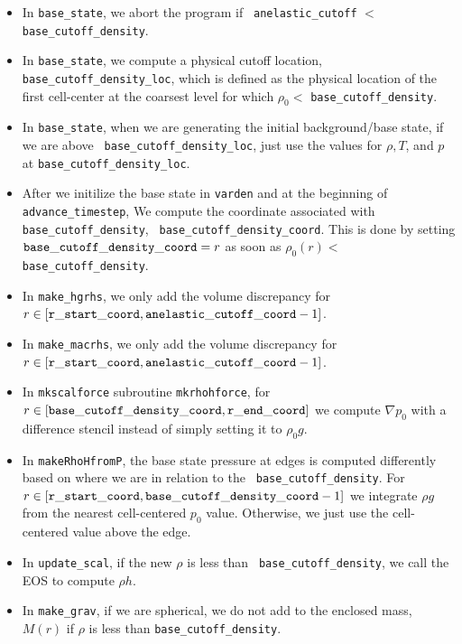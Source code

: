 \documentclass[11pt]{article}
\begin{document}
\begin{itemize}

\item In {\tt base\_state}, we abort the program if {\tt
  anelastic\_cutoff} $<$ {\tt base\_cutoff\_density}.

\item In {\tt base\_state}, we compute a physical cutoff location,
  {\tt base\_cutoff\_density\_loc}, which is defined as the physical
  location of the first cell-center at the coarsest level for which
  $\rho_0 <$ {\tt base\_cutoff\_density}.

\item In {\tt base\_state}, when we are generating the initial
  background/base state, if we are above {\tt
    base\_cutoff\_density\_loc}, just use the values for $\rho,T$, and
  $p$ at {\tt base\_cutoff\_density\_loc}.

\item After we initilize the base state in {\tt varden} and at the
  beginning of {\tt advance\_timestep}, We compute the coordinate
  associated with {\tt base\_cutoff\_density}, {\tt
    base\_cutoff\_density\_coord}.  This is done by setting ${\tt
    base\_cutoff\_density\_coord}= r$ as soon as $\rho_0(r) <$ {\tt
    base\_cutoff\_density}.

\item In {\tt make\_hgrhs}, we only add the volume discrepancy for
  $r\in[{\tt r\_start\_coord},{\tt anelastic\_cutoff\_coord}-1]$.

\item In {\tt make\_macrhs}, we only add the volume discrepancy for
  $r\in[{\tt r\_start\_coord},{\tt anelastic\_cutoff\_coord}-1]$.

\item In {\tt mkscalforce} subroutine {\tt mkrhohforce}, for
  $r\in[{\tt base\_cutoff\_density\_coord},{\tt r\_end\_coord}]$ we
  compute $\nabla p_0$ with a difference stencil instead of simply
  setting it to $\rho_0 g$.

\item In {\tt makeRhoHfromP}, the base state pressure at edges is
  computed differently based on where we are in relation to the {\tt
    base\_cutoff\_density}.  For $r\in[{\tt r\_start\_coord},{\tt
      base\_cutoff\_density\_coord}-1]$ we integrate $\rho g$ from the
  nearest cell-centered $p_0$ value.  Otherwise, we just use the
  cell-centered value above the edge.

\item In {\tt update\_scal}, if the new $\rho$ is less than {\tt
  base\_cutoff\_density}, we call the EOS to compute $\rho h$.

\item In {\tt make\_grav}, if we are spherical, we do not add to the
  enclosed mass, $M(r)$ if $\rho$ is less than {\tt base\_cutoff\_density}.
\end{itemize}
\end{document}
